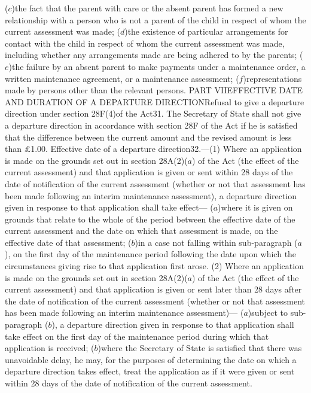 \documentclass[a4paper]{article}
\begin{document}
($c$)the fact that the parent with care or the absent parent has formed a new
relationship with a person who is not a parent of the child in respect of whom
the current assessment was made;
($d$)the existence of particular arrangements for contact with the child in
respect of whom the current assessment was made, including whether any
arrangements made are being adhered to by the parents;
($e$)the failure by an absent parent to make payments under a maintenance order, a
written maintenance agreement, or a maintenance assessment;
($f$)representations made by persons other than the relevant persons.
PART VIIEFFECTIVE DATE AND DURATION OF A DEPARTURE DIRECTIONRefusal to give a
departure direction under section 28F(4)of the Act31. The Secretary of State
shall not give a departure direction in accordance with section 28F of the Act
if he is satisfied that the difference between the current amount and the
revised amount is less than £1.00.
Effective date of a departure direction32.—(1) Where an application is made on
the grounds set out in section 28A(2)($a$) of the Act (the effect of the current
assessment) and that application is given or sent within 28 days of the date of
notification of the current assessment (whether or not that assessment has been
made following an interim maintenance assessment), a departure direction given
in response to that application shall take effect—
($a$)where it is given on grounds that relate to the whole of the period between
the effective date of the current assessment and the date on which that
assessment is made, on the effective date of that assessment;
($b$)in a case not falling within sub-paragraph ($a$), on the first day of the
maintenance period following the date upon which the circumstances giving rise
to that application first arose.
(2) Where an application is made on the grounds set out in section 28A(2)($a$) of
the Act (the effect of the current assessment) and that application is given or
sent later than 28 days after the date of notification of the current assessment
(whether or not that assessment has been made following an interim maintenance
assessment)—
($a$)subject to sub-paragraph ($b$), a departure direction given in response to that
application shall take effect on the first day of the maintenance period during
which that application is received;
($b$)where the Secretary of State is satisfied that there was unavoidable delay,
he may, for the purposes of determining the date on which a departure direction
takes effect, treat the application as if it were given or sent within 28 days
of the date of notification of the current assessment.
\end{document}

